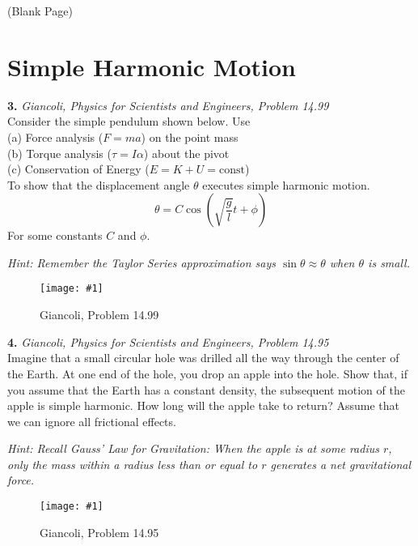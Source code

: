 \documentclass[11pt]{article}
\newcommand{\fig}[4]{
    \begin{figure}[H]
        \centering
        \texttt{[image: \#1]}
        \caption{#2}
        \label{exp4fit}
    \end{figure}
}
\theoremstyle{gangnamstyle}{\newtheorem{definition}{Definition}[]}
\theoremstyle{gangnamstyle}{\newtheorem{example}{Example}[]}
\theoremstyle{gangnamstyle}{\newtheorem{problem}{Problem}[]}
\begin{document}
\pagebreak

\begin{center}
(Blank Page)
\end{center}

\pagebreak

\section{Simple Harmonic Motion}

\textbf{3.} \textit{Giancoli, Physics for Scientists and Engineers, Problem 14.99} \\
Consider the simple pendulum shown below. Use \\
(a) Force analysis ($F = ma$) on the point mass \\
(b) Torque analysis ($\tau = I\alpha$) about the pivot \\
(c) Conservation of Energy ($E = K + U = \text{const}$) \\
To show that the displacement angle $\theta$ executes simple harmonic motion. 
\[ \theta = C\cos(\sqrt{\frac{g}{l}} t + \phi) \]
For some constants $C$ and $\phi$. 

\textit{Hint: Remember the Taylor Series approximation says $\sin\theta \approx \theta$ when $\theta$ is small.}
\fig{figs/0729/g99.png}{Giancoli, Problem 14.99}{0.5}{0}

\pagebreak

\textbf{4.} \textit{Giancoli, Physics for Scientists and Engineers, Problem 14.95} \\
Imagine that a small circular hole was drilled all the way through the center of the Earth. At one end of the hole, you drop an apple into the hole. Show that, if you assume that the Earth has a constant density, the subsequent motion of the apple is simple harmonic. How long will the apple take to return? Assume that we can ignore all frictional effects. 

\textit{Hint: Recall Gauss' Law for Gravitation: When the apple is at some radius $r$, only the mass within a radius less than or equal to $r$ generates a net gravitational force.}
\fig{figs/0729/g95.png}{Giancoli, Problem 14.95}{0.5}{0}

\pagebreak
\end{document}

